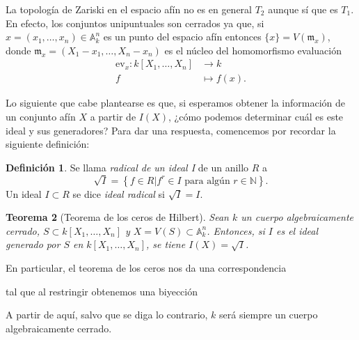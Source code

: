 \documentclass[12pt,a4paper]{article}
\newtheorem{thm}{Teorema}[section]
\theoremstyle{definition} \newtheorem{defn}[thm]{Definición}
\theoremstyle{definition} \newtheorem{ejemplo}[thm]{Ejemplo}
\theoremstyle{definition} \newtheorem{ejercicio}[thm]{Ejercicio}
\theoremstyle{remark} \newtheorem*{obs}{Observación}
\def\AA{\mathbb{A}}
\def\NN{\mathbb{N}}
\def\mm{\mathfrak{m}}
\begin{document}
La topología de Zariski en el espacio afín no es en general $T_2$ aunque sí que es $T_1$. En efecto, los conjuntos unipuntuales son cerrados ya que, si $x=(x_1,\dots,x_n)\in \AA_k^n$ es un punto del espacio afín entonces $\{x\}=V(\mm_x)$, donde $\mm_x=(X_1-x_1,\dots,X_n-x_n)$ es el núcleo del homomorfismo evaluación
\begin{align*}
  \mathrm{ev}_x :k[X_1,\dots,X_n]&\longrightarrow k\\ 
    f &\longmapsto f(x). 
  \end{align*}

  Lo siguiente que cabe plantearse es que, si esperamos obtener la información de un conjunto afín $X$ a partir de $I(X)$, ¿cómo podemos determinar cuál es este ideal y sus generadores? Para dar una respuesta, comencemos por recordar la siguiente definición:
  \begin{defn}
    Se llama \emph{radical de un ideal I} de un anillo $R$ a
    \begin{equation*}
      \sqrt{I}=\left\{ f\in R | f^r\in I \text{ para algún } r \in \NN \right\}.
    \end{equation*}
  Un ideal $I\subset R$ se dice \emph{ideal radical} si $\sqrt{I}=I$.
  \end{defn}

  \begin{thm}[Teorema de los ceros de Hilbert]
    Sean $k$ un cuerpo algebraicamente cerrado, $S\subset k[X_1,\dots,X_n]$ y $X=V(S)\subset \AA_k^n$. Entonces, si $I$ es el ideal generado por $S$ en $k[X_1,\dots,X_n]$, se tiene $I(X)=\sqrt{I}$.
  \end{thm}
  En particular, el teorema de los ceros nos da una correspondencia
  \begin{center}
  \end{center}
  tal que al restringir obtenemos una biyección
  \begin{center}
  \end{center}
  A partir de aquí, salvo que se diga lo contrario, $k$ será siempre un cuerpo algebraicamente cerrado.
\end{document}
